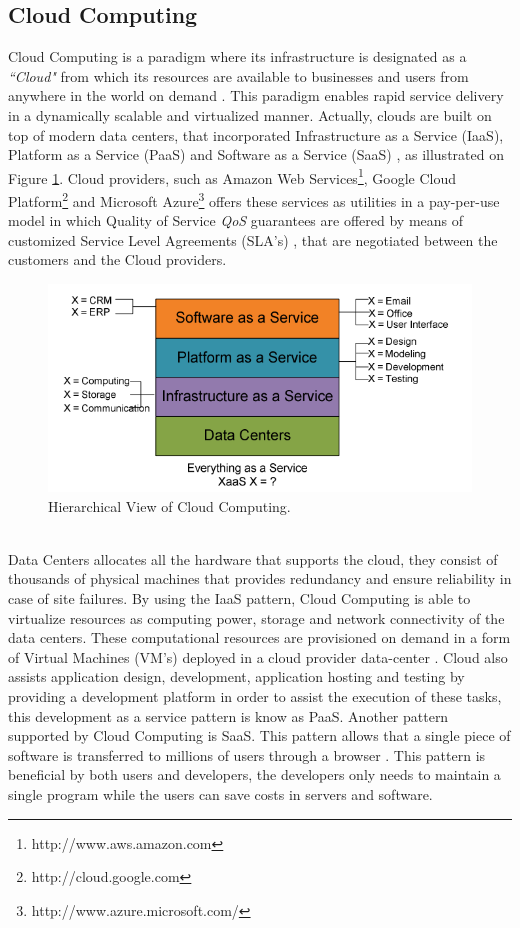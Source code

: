 \subsection{Cloud Computing}
\label{sub:cloud_computing}
Cloud Computing is a paradigm where its infrastructure is designated as a \textit{``Cloud"} from which its resources are available to businesses and users from anywhere in the world on demand \cite{buyya2009cloud}.
This paradigm enables rapid service delivery in a dynamically scalable and virtualized manner. Actually, clouds are built on top of modern data centers, that incorporated Infrastructure as a Service (IaaS),
Platform as a Service (PaaS) and Software as a Service (SaaS) \cite{tsai2010service}, as illustrated on Figure \ref{fig:high_level_cloud_view}. Cloud providers, such as Amazon Web Services\footnote{http://www.aws.amazon.com},
Google Cloud Platform\footnote{http://cloud.google.com} and Microsoft Azure\footnote{http://www.azure.microsoft.com/} offers these services as utilities in a pay-per-use model in which Quality of Service \textit{QoS} guarantees are offered
by means of customized Service Level Agreements (SLA's) \cite{vaquero2008break}, that are negotiated between the customers and the Cloud providers.
\begin{figure}[h!]
  \centering
  \includegraphics[width=.8\textwidth]{./images/high_level_cloud_view}
  \caption{Hierarchical View of Cloud Computing.}
  \label{fig:high_level_cloud_view}
\end{figure}\\
Data Centers allocates all the hardware that supports the cloud, they consist of thousands of physical machines that provides redundancy and ensure reliability in case of site failures. By using the IaaS pattern, Cloud Computing is able to virtualize
resources as computing power, storage and network connectivity of the data centers. These computational resources are provisioned on demand in a form of Virtual Machines (VM's) deployed in a cloud provider data-center \cite{sotomayor2009virtual}.
Cloud also assists application design, development, application hosting and testing by providing a development platform in order to assist the execution of these tasks, this development as a service pattern is know as PaaS. Another pattern supported by Cloud Computing
is SaaS. This pattern allows that a single piece of software is transferred to millions of users through a browser \cite{zhang2010cloud}. This pattern is beneficial by both users and developers, the developers only needs to maintain a single program while the users can
save costs in servers and software.\\

